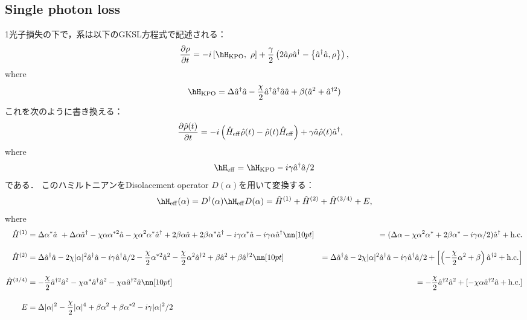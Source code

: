 \subsection{Single photon loss}
1光子損失の下で，系は以下のGKSL方程式で記述される：
\begin{align}\label{Eq.GKSL}
    \frac{\partial\rho}{\partial t} = -i\left[\hH_{\rm{KPO}}
    ,\ \rho\right] 
    +\frac{\gamma}{2} \left (2\hat a \rho \hat a^\dagger - \left\{ \hat a^\dagger \hat a, \rho \right\}\right),
\end{align}
where
\begin{equation}
    \hH_{\rm{KPO}}=\Delta \hat{a}^\dagger\hat{a} - \frac{\chi}{2} \hat{a}^\dagger\hat{a}^\dagger\hat{a}\hat{a} + \beta (\hat{a}^2 + \hat{a}^{\dagger 2})
\end{equation}
これを次のように書き換える：
\begin{align}
    \frac{\partial\hat{\rho}(t)}{\partial t}
    &= -i\left(
    \hat{H}_{\rm{eff}}\hat{\rho}(t)-\hat{\rho}(t)\hat{H}_{\rm{eff}}
    \right)
    +\gamma\hat{a}\hat{\rho}(t)\hat{a}^{\dag},
\end{align}
where
\begin{equation}
    \hH_{\rm{eff}} = \hH_{\rm{KPO}} -i\gamma\hat{a}^\dagger\hat{a}/2
\end{equation}
である．
このハミルトニアンをDisolacement operator $D(\alpha)$を用いて変換する：
\begin{equation}
    \hH_{\rm{eff}}(\alpha)=D^{\dag}(\alpha)\hH_{\rm{eff}}D(\alpha)=\hat{H}^{(1)} + \hat{H}^{(2)} + \hat{H}^{(3/4)} + E,
\end{equation}
where
\begin{align}
    \hat{H}^{(1)}&=
    \Delta\alpha^{\ast}\hat{a}\ + \Delta\alpha\hat{a}^{\dagger}
    - \chi\alpha\alpha^{\ast2}\hat{a}
    - \chi\alpha^2\alpha^{\ast}\hat{a}^{\dagger}
    +2\beta\alpha\hat{a}
    + 2\beta\alpha^{\ast}\hat{a}^{\dagger}
    -i\gamma\alpha^{\ast}\hat{a}
    -i\gamma\alpha\hat{a}^{\dagger}
    \nn[10pt]
    &=
    (\Delta\alpha
    - \chi\alpha^2\alpha^{\ast}
    + 2\beta\alpha^{\ast}-i\gamma\alpha/2)\hat{a}^{\dagger}
    +{\rm{h.c.}}
    \\[10pt]
    \hat{H}^{(2)}
    &=\Delta\hat{a}^{\dagger}\hat{a} 
    - 2\chi|\alpha|^2\hat{a}^{\dagger}\hat{a}
    -i\gamma\hat{a}^{\dagger}\hat{a}/2
    - \frac{\chi}{2}\alpha^{\ast2}\hat{a}^2
    - \frac{\chi}{2}\alpha^2\hat{a}^{\dagger2}
    +\beta\hat{a}^2+\beta\hat{a}^{\dagger2}
    \nn[10pt]
    &=\Delta\hat{a}^{\dagger}\hat{a} 
    - 2\chi|\alpha|^2\hat{a}^{\dagger}\hat{a}
    -i\gamma\hat{a}^{\dagger}\hat{a}/2
    +\left[\left(- \frac{\chi}{2}\alpha^2
    +\beta\right)\hat{a}^{\dagger2}
    +{\rm{h.c.}}\right]
    \\[10pt]
    \hat{H}^{(3/4)}&=
    - \frac{\chi}{2}\hat{a}^{\dagger2}\hat{a}^2 
    - \chi\alpha^{\ast}\hat{a}^{\dagger}\hat{a}^2
    - \chi\alpha\hat{a}^{\dagger2}\hat{a} 
    \nn[10pt]
    &=
    - \frac{\chi}{2}\hat{a}^{\dagger2}\hat{a}^2 
    +[- \chi\alpha\hat{a}^{\dagger2}\hat{a} +{\rm{h.c.}}]
    \\[10pt]
    E&=\Delta|\alpha|^2- \frac{\chi}{2}|\alpha|^4+\beta\alpha^2 
    +\beta\alpha^{\ast2}-i\gamma|\alpha|^2/2
\end{align}

